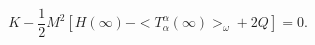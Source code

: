 \begin{equation}
K-\frac{1}{2}M^{2}[H(\infty)-<T_{\alpha}^{\alpha}(\infty)>_{\omega}+2Q]=0.
\label{23}\end{equation}

